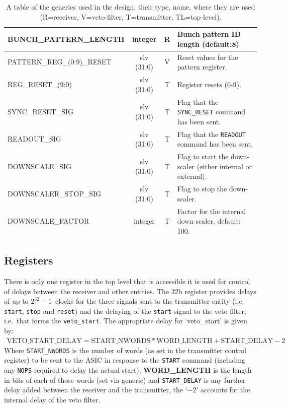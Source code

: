\begin{table}[htbp]
\begin{center}
\begin{tabulary}{\textwidth}{l| c | c | L}
      BUNCH\_PATTERN\_LENGTH     & integer    &  R              & Bunch pattern ID length (default:8) \\
      \hline                                                    
      PATTERN\_REG\_(0:9)\_RESET & slv (31:0) &  V              & Reset values for the pattern register.\\
      \hline                                                    
      REG\_RESET\_(9:0)          & slv (31:0) &  T              & Register resets (0-9). \\
      SYNC\_RESET\_SIG           & slv (31:0) &  T              & Flag that the \texttt{SYNC\_RESET} command has been sent.   \\
      READOUT\_SIG               & slv (31:0) &  T              & Flag that the \texttt{READOUT} command has been sent.       \\
      DOWNSCALE\_SIG             & slv (31:0) &  T              & Flag to start the down-scaler (either internal or external).\\
      DOWNSCALER\_STOP\_SIG      & slv (31:0) &  T              & Flag to stop the down-scaler.                               \\
      DOWNSCALE\_FACTOR          & integer    &  T              & Factor for the internal down-scaler, default: 100.          \\
    \end{tabulary}
  \end{center}
  \caption{A table of the generics used in the design, their type, name, where they are used (R=receiver, V=veto-filter, T=transmitter, TL=top-level).}
  \label{tab:all_generics}
\end{table}

\subsection{Registers} %
\label{sub:top_registers}
There is only one register in the top level that is accessible it is used for control of delays between the receiver and other entities. The 32b register provides delays of up to \( 2^{32} - 1 \)~clocks for the three signals sent to the transmitter entity (i.e. \texttt{start}, \texttt{stop} and \texttt{reset}) and the delaying of the \texttt{start} signal to the veto filter, i.e.\ that forms the \texttt{veto\_start}. The appropriate delay for `veto\_start' is given by:
\begin{align}\label{equ:veto_start_delay}
  \text{VETO\_START\_DELAY} = \text{START\_NWORDS} * \text{WORD\_LENGTH} + \text{START\_DELAY} - 2 
\end{align}
Where \texttt{START\_NWORDS} is the number of words (as set in the transmitter control register) to be sent to the ASIC in response to the \texttt{START} command (including any \texttt{NOPS} required to delay the actual start), \textbf{WORD\_LENGTH} is the length in bits of each of those words (set via generic) and \texttt{START\_DELAY} is any further delay added between the receiver and the transmitter, the `\(- 2\)' accounts for the internal delay of the veto filter. 
    
